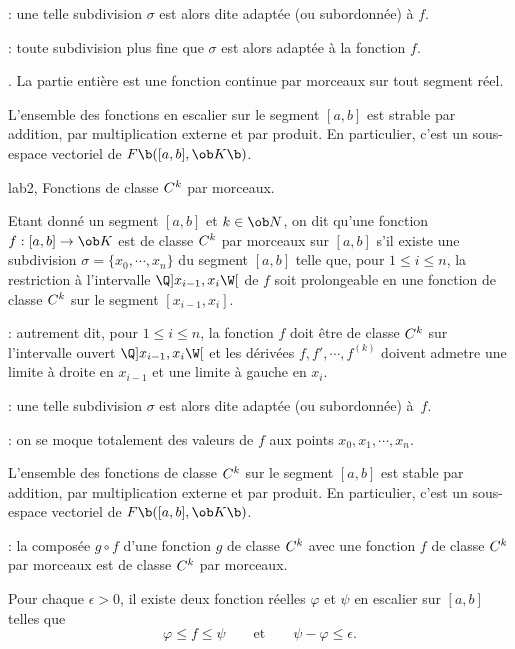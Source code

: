 \Remarque : une telle subdivision $\sigma$ est alors dite adapt\'ee (ou subordonn\'ee) \`a $f$. 
\bigskip

\Remarque  : toute subdivision plus fine que $\sigma$ est alors adapt\'ee \`a la fonction $f$. 
\bigskip

\Exemple.  La partie enti\`ere est une fonction continue par morceaux sur tout segment r\'eel. 
\bigskip

\Propriete []  L'ensemble des fonctions en escalier sur le segment $[a,b]$ est strable par addition, par multiplication externe et par produit. En particulier, c'est un sous-espace vectoriel de $\sc F\b([a,b],\ob K\b)$. 
\bigskip

\Subsection lab2, Fonctions de classe $\sc C^k$ par morceaux. 

\Definition []  Etant donn\'e un segment $[a,b]$ et $k\in\ob N$, on dit qu'une fonction $f:[a,b]\to\ob K$ est 
de classe $\sc C^k$ par morceaux sur $[a,b]$ s'il existe une subdivision $\sigma=\{x_0,\cdots,x_n\}$ du segment $[a,b]$ telle que, pour $1\le i\le n$, la restriction \`a l'intervalle $\Q]x_{i-1},x_i\W[$ de $f$ soit prolongeable en une fonction de classe $\sc C^k$ sur le segment $[x_{i-1},x_i]$. 
\bigskip

\Remarque : autrement dit, pour $1\le i\le n$, la fonction $f$ doit \^etre de classe $\sc C^k$ sur l'intervalle ouvert $\Q]x_{i-1},x_i\W[$ et les d\'eriv\'ees $f, f',\cdots, f^{(k)}$ doivent admetre une limite \`a droite en $x_{i-1}$ et une limite \`a gauche en $x_i$. 
\bigskip

\Remarque : une telle subdivision $\sigma$ est alors dite adapt\'ee (ou subordonn\'ee) \`a~$f$. 
\bigskip

\Remarque : on se moque totalement des valeurs de $f$ aux points $x_0, x_1, \cdots, x_n$. 
\bigskip


\Propriete []  L'ensemble des fonctions de classe $\sc C^k$ sur le segment $[a,b]$ est stable par addition, par multiplication externe et par produit. En particulier, c'est un sous-espace vectoriel de $\sc F\b([a,b],\ob K\b)$. 
\bigskip

\Remarque : la compos\'ee $g\circ f$ d'une fonction $g$ de classe $\sc C^k$ avec une fonction $f$ de classe $\sc C^k$ par morceaux est de classe $\sc C^k$ par morceaux. 
\bigskip

Pour chaque $\epsilon>0$, il existe deux fonction r\'eelles $\varphi$ et $\psi$ en escalier sur $[a,b]$ telles que 
$$
\varphi\le f\le \psi\qquad \mbox{et}\qquad \psi-\varphi\le \epsilon.
$$

